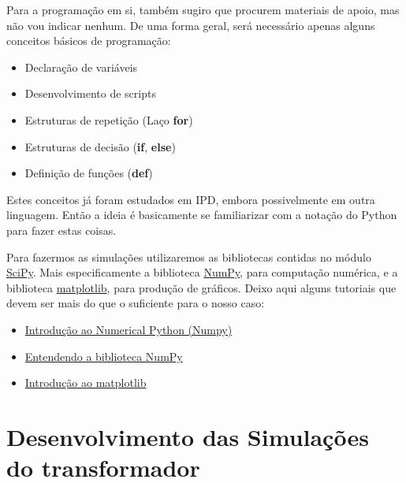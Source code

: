 \documentclass[a4paper]{article}
\theoremstyle{definition}
\theoremstyle{plain}
\begin{document}
Para a programação em si, também sugiro que procurem materiais de apoio, mas não vou indicar nenhum. De uma forma geral, será necessário apenas alguns conceitos básicos de programação: 

\begin{itemize}
\item Declaração de variáveis
\item Desenvolvimento de scripts 
\item Estruturas de repetição (Laço \textbf{for})
\item Estruturas de decisão (\textbf{if}, \textbf{else})
\item Definição de funções (\textbf{def})
\end{itemize}


Estes conceitos já foram estudados em IPD, embora possivelmente em outra linguagem. Então a ideia é basicamente se familiarizar com a notação do Python para fazer estas coisas.


Para fazermos as simulações utilizaremos as bibliotecas contidas no módulo \href{https://www.scipy.org/}{SciPy}. Mais especificamente a biblioteca \href{https://numpy.org/}{NumPy}, para computação numérica, e a biblioteca \href{https://matplotlib.org/}{matplotlib}, para produção de gráficos. Deixo aqui alguns tutoriais que devem ser mais do que o suficiente para o nosso caso:

\begin{itemize}
\item \href{http://www.opl.ufc.br/pt/post/numpy/}{Introdução ao Numerical Python (Numpy)}

\item \href{https://medium.com/ensina-ai/entendendo-a-biblioteca-numpy-4858fde63355}{Entendendo a biblioteca NumPy}

\item \href{https://gepac.github.io/2019-05-17-intro-matplotlib/}{Introdução ao matplotlib}
\end{itemize}


\section{Desenvolvimento das Simulações do transformador}
\end{document}
